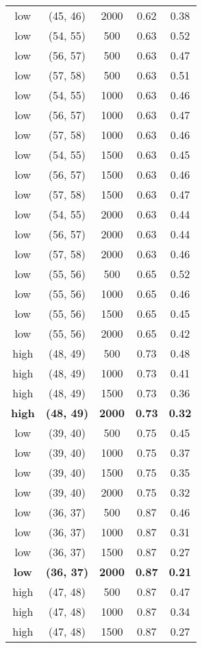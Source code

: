\begin{tabular}{c c c c c}
low & (45, 46) &  2000 & 0.62 & 0.38 \\
low & (54, 55) &  500 & 0.63 & 0.52 \\
low & (56, 57) &  500 & 0.63 & 0.47 \\
low & (57, 58) &  500 & 0.63 & 0.51 \\
low & (54, 55) &  1000 & 0.63 & 0.46 \\
low & (56, 57) &  1000 & 0.63 & 0.47 \\
low & (57, 58) &  1000 & 0.63 & 0.46 \\
low & (54, 55) &  1500 & 0.63 & 0.45 \\
low & (56, 57) &  1500 & 0.63 & 0.46 \\
low & (57, 58) &  1500 & 0.63 & 0.47 \\
low & (54, 55) &  2000 & 0.63 & 0.44 \\
low & (56, 57) &  2000 & 0.63 & 0.44 \\
low & (57, 58) &  2000 & 0.63 & 0.46 \\
low & (55, 56) &  500 & 0.65 & 0.52 \\
low & (55, 56) &  1000 & 0.65 & 0.46 \\
low & (55, 56) &  1500 & 0.65 & 0.45 \\
low & (55, 56) &  2000 & 0.65 & 0.42 \\
high & (48, 49) &  500 & 0.73 & 0.48 \\
high & (48, 49) &  1000 & 0.73 & 0.41 \\
high & (48, 49) &  1500 & 0.73 & 0.36 \\
\textbf{high} & \textbf{(48, 49)} & \textbf{ 2000} & \textbf{0.73} & \textbf{0.32} \\
low & (39, 40) &  500 & 0.75 & 0.45 \\
low & (39, 40) &  1000 & 0.75 & 0.37 \\
low & (39, 40) &  1500 & 0.75 & 0.35 \\
low & (39, 40) &  2000 & 0.75 & 0.32 \\
low & (36, 37) &  500 & 0.87 & 0.46 \\
low & (36, 37) &  1000 & 0.87 & 0.31 \\
low & (36, 37) &  1500 & 0.87 & 0.27 \\
\textbf{low} & \textbf{(36, 37)} & \textbf{ 2000} & \textbf{0.87} & \textbf{0.21} \\
high & (47, 48) &  500 & 0.87 & 0.47 \\
high & (47, 48) &  1000 & 0.87 & 0.34 \\
high & (47, 48) &  1500 & 0.87 & 0.27 \\

\end{tabular}

